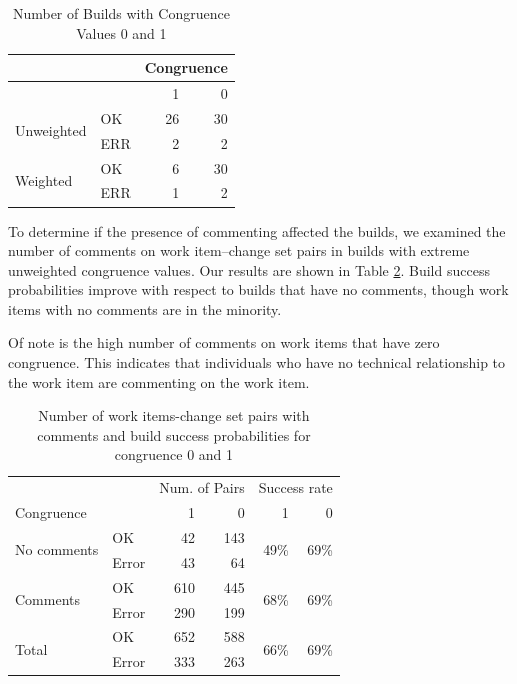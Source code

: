 \begin{table}[t]
\centering
\begin{tabular}{ll|rr}
& & \multicolumn{2}{c}{Congruence} \\\hline
&  & 1 & 0 \\\hline 
\multirow{2}{*}{Unweighted} & OK & 26 & 30 \\
                            & ERR & 2 & 2 \\\hline
\multirow{2}{*}{Weighted} & OK & 6 & 30 \\
                         & ERR & 1 & 2 \\
\end{tabular}
\caption{Number of Builds with Congruence Values 0 and 1}
\label{tab:congruence_extremes}
\end{table}

To determine if the presence of commenting affected the builds, we examined the number of comments on work item--change set pairs in builds with extreme unweighted congruence values. Our results are shown in Table \ref{tab:changeset_commenters}. Build success probabilities improve with respect to builds that have no comments, though work items with no comments are in the minority.

Of note is the high number of comments on work items that have zero congruence. This indicates that individuals who have no technical relationship to the work item are commenting on the work item.

\begin{table}[t]
\centering
\begin{tabular}{ll|rr|rr}
& & \multicolumn{2}{c|}{Num. of Pairs} & \multicolumn{2}{c}{Success rate} \\
Congruence &                                & 1     & 0   & 1 & 0 \\\hline 
\multirow{2}{*}{No comments} 	& OK 	  & 42   & 143  &  \multirow{2}{*}{49\%} & \multirow{2}{*}{69\%}  \\
                            	& Error   & 43    & 64   &  & \\\hline
\multirow{2}{*}{Comments} 	& OK 	  & 610  & 445  & \multirow{2}{*}{68\%} & \multirow{2}{*}{69\%}  \\
                         	& Error   & 290   & 199  &  & \\\hline
\multirow{2}{*}{Total} 		& OK		  & 652 & 588 &     \multirow{2}{*}{66\%} & \multirow{2}{*}{69\%}   \\
                       		& Error   & 333  & 263 & &\\
\end{tabular}
\caption{Number of work items-change set pairs with comments and build success probabilities for congruence 0 and 1}
\label{tab:changeset_commenters}
\end{table}

